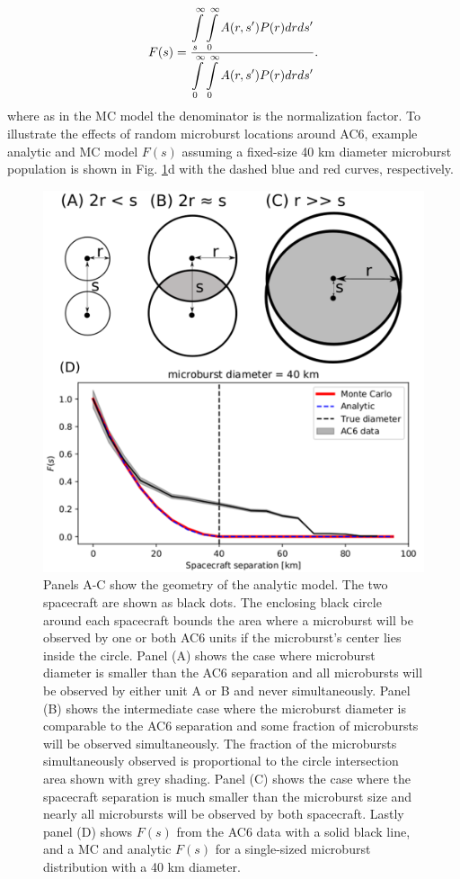 \documentclass[draft]{agujournal2019}
\begin{document}
\begin{equation} \label{analytic_integral}
F(s) = \frac{\displaystyle\int\displaylimits_{s}^{\infty} \displaystyle\int\displaylimits_0^{\infty} A(r, s') P(r) dr ds'}{\displaystyle\int\displaylimits_{0}^{\infty} \displaystyle\int\displaylimits_0^{\infty} A(r, s') P(r) dr ds'} .
\end{equation} where as in the MC model the denominator is the normalization factor. To illustrate the effects of random microburst locations around AC6, example analytic and MC model $F(s)$ assuming a fixed-size 40 km diameter microburst population is shown in Fig. \ref{fig5}d with the dashed blue and red curves, respectively.

\begin{figure}
\includegraphics[width=\textwidth]{fig5.png}
\caption{Panels A-C show the geometry of the analytic model. The two spacecraft are shown as black dots. The enclosing black circle around each spacecraft bounds the area where a microburst will be observed by one or both AC6 units if the microburst's center lies inside the circle. Panel (A) shows the case where microburst diameter is smaller than the AC6 separation and all microbursts will be observed by either unit A or B and never simultaneously. Panel (B) shows the intermediate case where the microburst diameter is comparable to the AC6 separation and some fraction of microbursts will be observed simultaneously. The fraction of the microbursts simultaneously observed is proportional to the circle intersection area shown with grey shading. Panel (C) shows the case where the spacecraft separation is much smaller than the microburst size and nearly all microbursts will be observed by both spacecraft. Lastly panel (D) shows $F(s)$ from the AC6 data with a solid black line, and a MC and analytic $F(s)$ for a single-sized microburst distribution with a 40 km diameter.} 
\label{fig5}
\end{figure}
\end{document}
